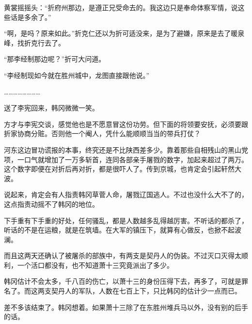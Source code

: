 黄裳摇摇头：“折府州那边，是遵正兄受命去的。我这边只是奉命体察军情，说这些话是多余了。”

“啊，是吗？原来如此。”折克仁还以为折可适没来，是为了避嫌，原来是去了暖泉峰，找折克行去了。

“那李经制那边呢？”折可大问道。

“李经制现如今就在胜州城中，龙图直接跟他说。”

……………………

送了李宪回来，韩冈微微一笑。

方才与李宪交谈，感觉他也是不愿意冒这份功劳。但下面的将领要安抚，必须要跟折家协商分赃。否则他一个阉人，凭什么能顺顺当当的带兵打仗？

河东这边冒功谎报的本事，终究还是不比陕西差多少。靠着那些自相残山的黑山党项，一口气就增加了一万多斩首，连同各部亲手屠戮的数字，加起来超过了两万。这个数字即便在对折后再对折，都是很吓人了。传到京城，也肯定会引起轩然大波。

说起来，肯定会有人指责韩冈草菅人命，屠戮辽国逃人。不过也没什么大不了的，这点指责动摇不了韩冈的地位。

下手重有下手重的好处，任何骚乱，都是人数越多乱得越厉害。不听话的都杀了，听话的不是在运粮，就是在筑墙。在大军的镇压下，就算有心做反，也掀不起波澜。

而且这两天还确认了被屠杀的部族中，有两支是契丹人的伪装。不过灭口灭得太顺利，一个活口都没有，也不知道萧十三究竟派出了多少。

韩冈估计不会太多，千八百的伤亡，以萧十三的身份压得下去，再多了，可就是罪名了。而这两支契丹人的军队，人数在七百上下，只比韩冈的估计少一点而已。

差不多该结束了。韩冈想着。如果萧十三除了在东胜州堆兵马以外，没有别的后手的话。

